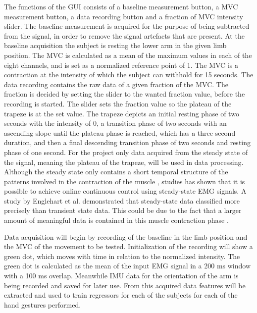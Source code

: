 The functions of the GUI consists of a baseline measurement button, a MVC measurement button, a data recording button and a fraction of MVC intensity slider. The baseline measurement is acquired for the purpose of being subtracted from the signal, in order to remove the signal artefacts that are present. At the baseline acquisition the subject is resting the lower arm in the given limb position. The MVC is calculated as a mean of the maximum values in each of the eight channels, and is set as a normalized reference point of 1. The MVC is a contraction at the intensity of which the subject can withhold for 15 seconds. The data recording contains the raw data of a given fraction of the MVC. The fraction is decided by setting the slider to the wanted fraction value, before the recording is started. The slider sets the fraction value so the plateau of the trapeze is at the set value. The trapeze depicts an initial resting phase of two seconds with the intensity of 0, a transition phase of two seconds with an ascending slope until the plateau phase is reached, which has a three second duration, and then a final descending transition phase of two seconds and resting phase of one second. 
For the project only data acquired from the steady state of the signal, meaning the plateau of the trapeze, will be used in data processing. Although the steady state only contains a short temporal structure of the patterns involved in the contraction of the muscle \cite{mobarak}, studies has shown that it is possible to achieve online continuous control using steady-state EMG signals. A study by Englehart et al. \cite{englehart} demonstrated that steady-state data classified more precisely than transient state data. This could be due to the fact that a larger amount of meaningful data is contained in this muscle contraction phase \cite{mobarak}.

Data acquisition will begin by recording of the baseline in the limb position and the MVC of the movement to be tested. Initialization of the recording will show a green dot, which moves with time in relation to the normalized intensity. The green dot is calculated as the mean of the input EMG signal in a 200 ms window with a 100 ms overlap. Meanwhile IMU data for the orientation of the arm is being recorded and saved for later use. %
From this acquired data features will be extracted and used to train regressors for each of the subjects for each of the hand gestures performed.


